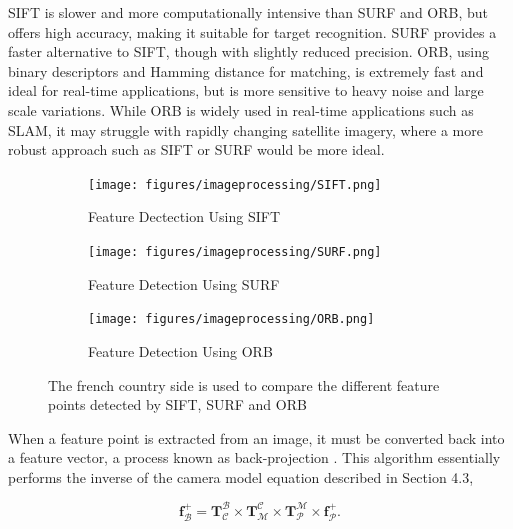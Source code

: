 \noindent
SIFT is slower and more computationally intensive than SURF and ORB, but offers high accuracy, making it suitable for target recognition. SURF provides a faster alternative to SIFT, though with slightly reduced precision. ORB, using binary descriptors and Hamming distance for matching, is extremely fast and ideal for real-time applications, but is more sensitive to heavy noise and large scale variations. While ORB is widely used in real-time applications such as SLAM, it may struggle with rapidly changing satellite imagery, where a more robust approach such as SIFT or SURF would be more ideal. 

\begin{figure}[H]
    \centering
    \begin{subfigure}[b]{0.30\linewidth}
        \centering
        \texttt{[image: figures/imageprocessing/SIFT.png]}
        \caption{Feature Dectection Using SIFT}
        \label{fig:SIFT}
    \end{subfigure}
    \hfill
    \begin{subfigure}[b]{0.30\linewidth}
        \centering
        \texttt{[image: figures/imageprocessing/SURF.png]}
        \caption{Feature Detection Using SURF}
        \label{fig:SURF}
    \end{subfigure}
    \hfill
    \begin{subfigure}[b]{0.30\linewidth}
        \centering
        \texttt{[image: figures/imageprocessing/ORB.png]}
        \caption{Feature Detection Using ORB}
        \label{fig:ORB}
    \end{subfigure}
    \caption{The french country side is used to compare the different feature points detected by SIFT, SURF and ORB}
    \label{fig:FeatureDetection}
\end{figure}


\noindent
When a feature point is extracted from an image, it must be converted back into a feature vector, a process known as back-projection \cite{Korf}. This 
algorithm essentially performs the inverse of the camera model equation described in Section 4.3,

\begin{equation}
    \mathbf{f}_\mathcal{B}^+ = \mathbf{T}_\mathcal{C}^\mathcal{B} \times \mathbf{T}_\mathcal{M}^\mathcal{C} \times \mathbf{T}_\mathcal{P}^\mathcal{M} \times \mathbf{f}_\mathcal{P}^+ \text{.}
\end{equation}

